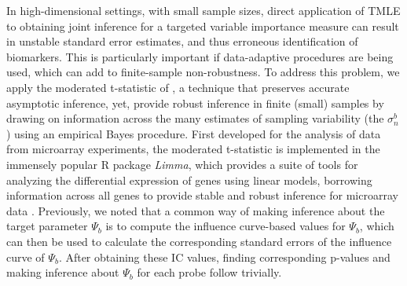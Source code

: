 In high-dimensional settings, with small sample sizes, direct application of
TMLE to obtaining joint inference for a targeted variable importance measure
can result in unstable standard error estimates, and thus erroneous
identification of biomarkers. This is particularly important if data-adaptive
procedures are being used, which can add to finite-sample non-robustness. To
address this problem, we apply the moderated t-statistic of
\cite{smyth2005limma}, a technique that preserves accurate asymptotic
inference, yet, provide robust inference in finite (small) samples by drawing
on information across the many estimates of sampling variability (the
$\sigma^b_n$) using an empirical Bayes procedure. First developed for the
analysis of data from microarray experiments, the moderated t-statistic is
implemented in the immensely popular R package {\em Limma}, which provides a
suite of tools for analyzing the differential expression of genes using linear
models, borrowing information across all genes to provide stable and robust
inference for microarray data \cite{smyth2005limma}. Previously, we noted that
a common way of making inference about the target parameter $\Psi_b$ is to
compute the influence curve-based values for $\Psi_b$, which can then be used
to calculate the corresponding standard errors of the influence curve of
$\Psi_b$. After obtaining these IC values, finding corresponding p-values and
making inference about $\Psi_b$ for each probe follow trivially.

